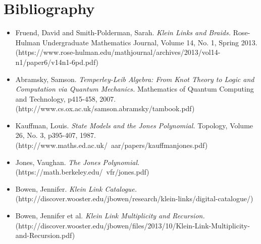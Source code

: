 \documentclass[12pt]{article}
\begin{document}
\clearpage


\section{Bibliography}

\begin{itemize}

\item Fruend, David and Smith-Polderman, Sarah. \textit{Klein Links and Braids.} Rose-Hulman Undergraduate Mathematics Journal, Volume 14, No. 1, Spring 2013. \\ (https://www.rose-hulman.edu/mathjournal/archives/2013/vol14-n1/paper6/v14n1-6pd.pdf)

\item Abramsky, Samson. \textit{Temperley-Leib Algebra: From Knot Theory to Logic and Computation via Quantum Mechanics.} Mathematics of Quantum Computing and Technology, p415-458, 2007. \\ (http://www.cs.ox.ac.uk/samson.abramsky/tambook.pdf)

\item Kauffman, Louis. \textit{State Models and the Jones Polynomial.} Topology, Volume 26, No. 3, p395-407, 1987.  \\
(http://www.maths.ed.ac.uk/~aar/papers/kauffmanjones.pdf)

\item Jones, Vaughan. \textit{The Jones Polynomial.} \\ (https://math.berkeley.edu/~vfr/jones.pdf)

\item Bowen, Jennifer. \textit{Klein Link Catalogue.} \\ (http://discover.wooster.edu/jbowen/research/klein-links/digital-catalogue/)

\item Bowen, Jennifer et al. \textit{Klein Link Multiplicity and Recursion.} \\ (http://discover.wooster.edu/jbowen/files/2013/10/Klein-Link-Multiplicity-and-Recursion.pdf)


\end{itemize}



\end{document}
